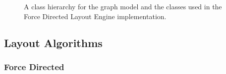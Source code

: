 \documentclass[runningheads]{cl2emult}
\begin{document}
\begin{figure}[h]
  \centering
  \caption{A class hierarchy for the graph model and the classes used
  in the Force Directed Layout Engine implementation.}
\end{figure}

\subsection{Layout Algorithms}
\subsubsection{Force Directed} \label{sec:forcedirectedlayout}
\end{document}
